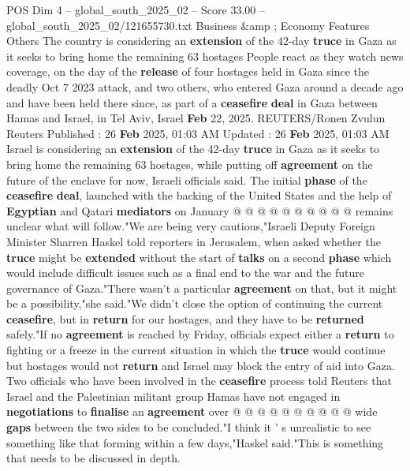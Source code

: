 \begin{textsample}{POS Dim 4 – global\_south\_2025\_02 – Score 33.00 – global\_south\_2025\_02/121655730.txt}  \label{ex:f4_pos_022}
Business \&amp ; Economy Features Others The country is considering an \textbf{extension} of the 42-day \textbf{truce} in Gaza as it seeks to bring home the remaining 63 hostages People react as they watch news coverage, on the day of the \textbf{release} of four hostages held in Gaza since the deadly Oct 7 2023 attack, and two others, who entered Gaza around a decade ago and have been held there since, as part of a \textbf{ceasefire} \textbf{deal} in Gaza between Hamas and Israel, in Tel Aviv, Israel \textbf{Feb} 22, 2025.
REUTERS/Ronen Zvulun Reuters Published : 26 \textbf{Feb} 2025, 01:03 AM Updated : 26 \textbf{Feb} 2025, 01:03 AM Israel is considering an \textbf{extension} of the 42-day \textbf{truce} in Gaza as it seeks to bring home the remaining 63 hostages, while putting off \textbf{agreement} on the future of the enclave for now, Israeli officials said.
The initial \textbf{phase} of the \textbf{ceasefire} \textbf{deal}, launched with the backing of the United States and the help of \textbf{Egyptian} and Qatari \textbf{mediators} on January @ @ @ @ @ @ @ @ @ @ remains unclear what will follow."We are being very cautious,"Israeli Deputy Foreign Minister Sharren Haskel told reporters in Jerusalem, when asked whether the \textbf{truce} might be \textbf{extended} without the start of \textbf{talks} on a second \textbf{phase} which would include difficult issues such as a final end to the war and the future governance of Gaza."There wasn't a particular \textbf{agreement} on that, but it might be a possibility,"she said."We didn't close the option of continuing the current \textbf{ceasefire}, but in \textbf{return} for our hostages, and they have to be \textbf{returned} safely."If no \textbf{agreement} is reached by Friday, officials expect either a \textbf{return} to fighting or a freeze in the current situation in which the \textbf{truce} would continue but hostages would not \textbf{return} and Israel may block the entry of aid into Gaza.
Two officials who have been involved in the \textbf{ceasefire} process told Reuters that Israel and the Palestinian militant group Hamas have not engaged in \textbf{negotiations} to \textbf{finalise} an \textbf{agreement} over @ @ @ @ @ @ @ @ @ @ wide \textbf{gaps} between the two sides to be concluded."I think it ' s unrealistic to see something like that forming within a few days,"Haskel said."This is something that needs to be discussed in depth.

\end{textsample}
